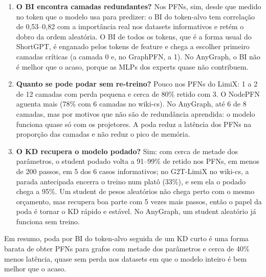 \documentclass[12pt,a4paper]{article}
\begin{document}
\begin{enumerate}
  \item \textbf{O BI encontra camadas redundantes?} Nos PFNs, sim, desde que medido no token que o modelo usa para predizer: o BI do token-alvo tem correlação de 0,53--0,82 com a importância real nos datasets informativos e retém o dobro da ordem aleatória. O BI de todos os tokens, que é a forma usual do ShortGPT, é enganado pelos tokens de feature e chega a escolher primeiro camadas críticas (a camada 0 e, no GraphPFN, a 1). No AnyGraph, o BI não é melhor que o acaso, porque as MLPs dos experts quase não contribuem.
  \item \textbf{Quanto se pode podar sem re-treino?} Pouco nos PFNs do LimiX: 1 a 2 de 12 camadas com perda pequena e cerca de 80\% retido com 3. O NodePFN aguenta mais (78\% com 6 camadas no wiki-cs). No AnyGraph, até 6 de 8 camadas, mas por motivos que não são de redundância aprendida: o modelo funciona quase só com os projetores. A poda reduz a latência dos PFNs na proporção das camadas e não reduz o pico de memória.
  \item \textbf{O KD recupera o modelo podado?} Sim: com cerca de metade dos parâmetros, o student podado volta a 91--99\% de retido nos PFNs, em menos de 200 passos, em 5 dos 6 casos informativos; no G2T-LimiX no wiki-cs, a parada antecipada encerra o treino num platô (33\%), e sem ela o podado chega a 95\%. Um student de pesos aleatórios não chega perto com o mesmo orçamento, mas recupera boa parte com 5 vezes mais passos, então o papel da poda é tornar o KD rápido e estável. No AnyGraph, um student aleatório já funciona sem treino.
\end{enumerate}

Em resumo, poda por BI do token-alvo seguida de um KD curto é uma forma barata de obter PFNs para grafos com metade dos parâmetros e cerca de 40\% menos latência, quase sem perda nos datasets em que o modelo inteiro é bem melhor que o acaso.
\end{document}
